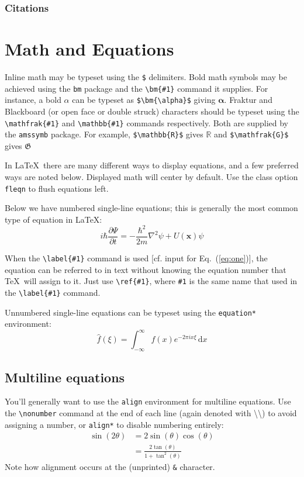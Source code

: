 \documentclass[]{article}
\begin{document}
\subsubsection{Citations}

\section{Math and Equations}
Inline math may be typeset using the \verb+$+ delimiters. Bold math
symbols may be achieved using the \verb+bm+ package and the
\verb+\bm{#1}+ command it supplies. For instance, a bold $\alpha$ can
be typeset as \verb+$\bm{\alpha}$+ giving $\bm{\alpha}$. Fraktur and
Blackboard (or open face or double struck) characters should be
typeset using the \verb+\mathfrak{#1}+ and \verb+\mathbb{#1}+ commands
respectively. Both are supplied by the \texttt{amssymb} package. For
example, \verb+$\mathbb{R}$+ gives $\mathbb{R}$ and
\verb+$\mathfrak{G}$+ gives $\mathfrak{G}$

In \LaTeX\ there are many different ways to display equations, and a
few preferred ways are noted below. Displayed math will center by
default. Use the class option \verb+fleqn+ to flush equations left.

Below we have numbered single-line equations; this is generally the most common
type of equation in \LaTeX: 
\begin{equation} \label{eq:one}
  i \hbar \frac{\partial \Psi}{\partial t} = -\frac{\hbar^2}{2m}\nabla^2 \psi + U(\mathbf{x}) \psi
\end{equation}

When the \verb+\label{#1}+ command is used [cf. input for
Eq.~(\ref{eq:one})], the equation can be referred to in text without
knowing the equation number that \TeX\ will assign to it. Just
use \verb+\ref{#1}+, where \verb+#1+ is the same name that used in
the \verb+\label{#1}+ command.

Unnumbered single-line equations can be typeset
using the \verb+equation*+ environment:
\begin{equation*}
  \hat{f}(\xi) = \int_{-\infty}^\infty f(x) e^{-2\pi i x \xi} \, \mathrm{d}x
\end{equation*}


\subsection{Multiline equations}

You'll generally want to use the \verb+align+ environment for multiline equations. Use the \verb+\nonumber+ command at the end of each line (again denoted with \textbackslash\textbackslash)
to avoid assigning a number, or \verb+align*+ to disable numbering entirely:
\begin{align}
  \sin(2\theta) &= 2 \sin(\theta) \cos(\theta) \nonumber \\
                &= \frac{2\tan(\theta)}{1 + \tan^2(\theta)}
\end{align}
Note how alignment occurs at the (unprinted) \verb+&+ character.
\end{document}
